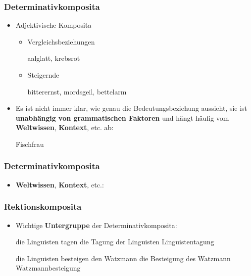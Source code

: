 \begin{frame}
\frametitle{Determinativkomposita}

\begin{itemize}
	\item Adjektivische Komposita
	
	\begin{itemize}
		\item Vergleichsbeziehungen
		
		\ea aalglatt, krebsrot
		\z
		
		\item Steigernde
		
		\ea bitterernst, mordsgeil, bettelarm
		\z
		
	\end{itemize}
	
	\item Es ist nicht immer klar, wie genau die Bedeutungsbeziehung aussieht, sie ist \textbf{unabhängig von grammatischen Faktoren} und hängt häufig vom \textbf{Weltwissen}, \textbf{Kontext}, etc. ab:
	
	\ea Fischfrau
	\z
	
\end{itemize}


\end{frame}


\begin{frame}
\frametitle{Determinativkomposita}

\begin{itemize}
	\item \textbf{Weltwissen}, \textbf{Kontext}, etc.:
\end{itemize}

\begin{figure}
\centering
\end{figure}

\end{frame}




\begin{frame}
\frametitle{Rektionskomposita}

\begin{itemize}
	\item Wichtige \textbf{Untergruppe} der Determinativkomposita:
	
	\eal \label{ex:Bsp1} 
        \ex die Linguisten tagen
        \ex die Tagung der Linguisten
        \ex Linguistentagung
	\zl
	
	\eal \label{ex:Bsp2} 
        \ex die Linguisten besteigen den Watzmann
        \ex die Besteigung des Watzmann
        \ex Watzmannbesteigung
	\zl
		 
\end{itemize}


\end{frame}


